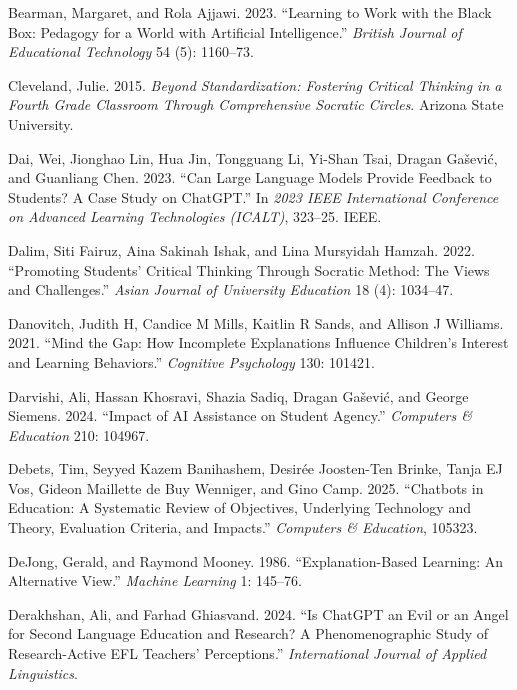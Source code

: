 \documentclass[
  12pt,
]{article}
\newlength{\cslhangindent}
\newenvironment{CSLReferences}[2] %
 {\begin{list}{}{%
  \setlength{\itemindent}{0pt}
  \setlength{\leftmargin}{0pt}
  \setlength{\parsep}{0pt}
  \ifodd #1
   \setlength{\leftmargin}{\cslhangindent}
   \setlength{\itemindent}{-1\cslhangindent}
  \fi
  \setlength{\itemsep}{#2\baselineskip}}}
 {\end{list}}
\begin{document}
\protect{}\label{refs}
\begin{CSLReferences}{1}{0}
Bearman, Margaret, and Rola Ajjawi. 2023. {``Learning to Work with the Black Box: Pedagogy for a World with Artificial Intelligence.''} \emph{British Journal of Educational Technology} 54 (5): 1160--73.

Cleveland, Julie. 2015. \emph{Beyond Standardization: Fostering Critical Thinking in a Fourth Grade Classroom Through Comprehensive Socratic Circles}. Arizona State University.

Dai, Wei, Jionghao Lin, Hua Jin, Tongguang Li, Yi-Shan Tsai, Dragan Gašević, and Guanliang Chen. 2023. {``Can Large Language Models Provide Feedback to Students? A Case Study on ChatGPT.''} In \emph{2023 IEEE International Conference on Advanced Learning Technologies (ICALT)}, 323--25. IEEE.

Dalim, Siti Fairuz, Aina Sakinah Ishak, and Lina Mursyidah Hamzah. 2022. {``Promoting Students' Critical Thinking Through Socratic Method: The Views and Challenges.''} \emph{Asian Journal of University Education} 18 (4): 1034--47.

Danovitch, Judith H, Candice M Mills, Kaitlin R Sands, and Allison J Williams. 2021. {``Mind the Gap: How Incomplete Explanations Influence Children's Interest and Learning Behaviors.''} \emph{Cognitive Psychology} 130: 101421.

Darvishi, Ali, Hassan Khosravi, Shazia Sadiq, Dragan Gašević, and George Siemens. 2024. {``Impact of AI Assistance on Student Agency.''} \emph{Computers \& Education} 210: 104967.

Debets, Tim, Seyyed Kazem Banihashem, Desirée Joosten-Ten Brinke, Tanja EJ Vos, Gideon Maillette de Buy Wenniger, and Gino Camp. 2025. {``Chatbots in Education: A Systematic Review of Objectives, Underlying Technology and Theory, Evaluation Criteria, and Impacts.''} \emph{Computers \& Education}, 105323.

DeJong, Gerald, and Raymond Mooney. 1986. {``Explanation-Based Learning: An Alternative View.''} \emph{Machine Learning} 1: 145--76.

Derakhshan, Ali, and Farhad Ghiasvand. 2024. {``Is ChatGPT an Evil or an Angel for Second Language Education and Research? A Phenomenographic Study of Research-Active EFL Teachers' Perceptions.''} \emph{International Journal of Applied Linguistics}.


\end{CSLReferences}
\end{document}
